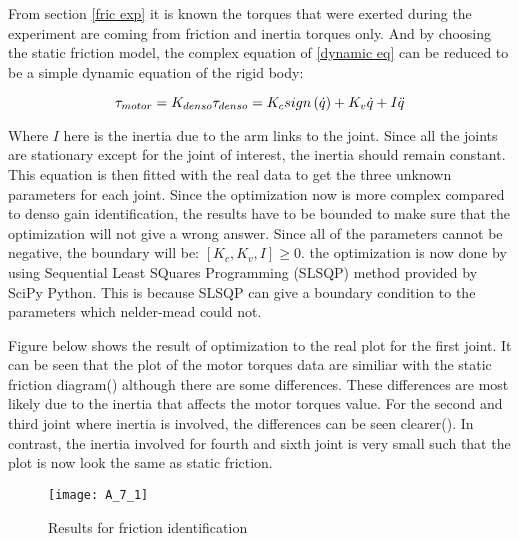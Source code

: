 From section \ref{fric exp} it is known the torques that were exerted during the experiment are coming from friction and inertia torques only. And by choosing the static friction model, the complex equation of \ref{dynamic eq} can be reduced to be a simple dynamic equation of the rigid body:

\begin{equation}
  \tau_{motor} = K_{denso} \tau_{denso} = K_{c} sign\left(\dot{q}\right) + K_{v} \dot{q} + I\ddot{q} \\
\end{equation}

Where $ I $ here is the inertia due to the arm links to the joint. Since all the joints are stationary except for the joint of interest, the inertia should remain constant. This equation is then fitted with the real data to get the three unknown parameters for each joint. Since the optimization now is more complex compared to denso gain identification, the results have to be bounded to make sure that the optimization will not give a wrong answer. Since all of the parameters cannot be negative, the boundary will be: $[K_{c}, K_{v}, I] \geq 0$. the optimization is now done by using Sequential Least SQuares Programming (SLSQP) method provided by SciPy Python. This is because SLSQP can give a boundary condition to the parameters which nelder-mead could not.


Figure below shows the result of optimization to the real plot for the first joint. It can be seen that the plot of the motor torques data are similiar with the static friction diagram() although there are some differences. These differences are most likely due to the inertia that affects the motor torques value. For the second and third joint where inertia is involved, the differences can be seen clearer(). In contrast, the inertia involved for fourth and sixth joint is very small such that the plot is now look the same as static friction.
 
\begin{figure}[H]
    \centering
    \texttt{[image: A\_7\_1]}
    \caption{Results for friction identification}
    \label{fig: fric iden}
\end{figure}

